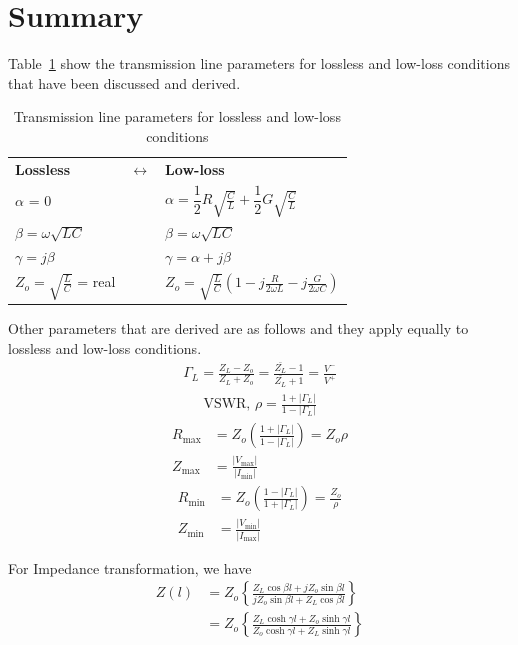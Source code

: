 \section{Summary}
Table~\ref{tab:transparams} show the transmission line parameters for lossless and low-loss conditions that have been discussed and derived.
\begin{table}[h]
\caption[short]{Transmission line parameters for lossless and low-loss conditions}
\label{tab:transparams}
\begin{tabular}{l c l}
{\bf Lossless}&   	$\leftrightarrow$  & {\bf Low-loss}  \\ 
$\alpha$ = 0 &  & $\alpha = \dfrac{1}{2}R\sqrt{\frac{C}{L}} + \dfrac{1}{2}G\sqrt{\frac{C}{L}}$\\
$\beta = \omega\sqrt{LC}$ & & $\beta = \omega\sqrt{LC}$\\
$\gamma = j\beta$ & & $\gamma = \alpha + j\beta$\\
$Z_o = \sqrt{\frac{L}{C}}$ = real &  & 	$Z_o = \sqrt{\frac{L}{C}}\left(1 - j\frac{R}{2\omega L} - j\frac{G}{2\omega C}\right)$
\end{tabular} 
\end{table} 

Other parameters that are derived are as follows and they apply equally to lossless and low-loss conditions.
\begin{align*}
\Gamma_L = \frac{Z_L - Z_o}{Z_L + Z_o} = \frac{\bar{Z_L} - 1}{\bar{Z_L} + 1} = \frac{V^-}{V^+}
\end{align*}
\begin{align*}
\text{VSWR, }\rho = \frac{1 + |\Gamma_L|}{1 - |\Gamma_L|}
\end{align*}
\begin{align*}
R_\max &= Z_o \left( \frac{1 + |\Gamma_L|}{1 - |\Gamma_L|}\right) = Z_o \rho\\
Z_\max &= \frac{|V_\max|}{|I_\min|}
\end{align*}
\begin{align*}
R_\min &= Z_o \left(\frac{1 - |\Gamma_L|}{1 + |\Gamma_L|}\right) = \frac{Z_o}{\rho}\\
Z_\min &= \frac{|V_\min|}{|I_\max|}
\end{align*}

For Impedance transformation, we have
\begin{align*}
Z(l) &= Z_o\left\lbrace\frac{Z_L\cos\beta l + jZ_o\sin\beta l}{jZ_o\sin\beta l + Z_L\cos\beta l}\right\rbrace\\ 
&= Z_o\left\lbrace\frac{Z_L\cosh\gamma l + Z_o\sinh\gamma l}{Z_o\cosh\gamma l + Z_L\sinh\gamma l}\right\rbrace
\end{align*}

